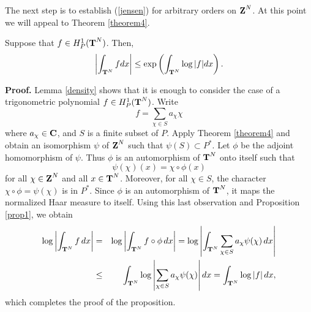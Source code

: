 The next step is to establish (\ref{jensen})
for arbitrary orders on $\Z^N$.  At this point we will
appeal to Theorem \ref{theorem4}.
\begin{prop2}
Suppose that $f\in H^1_{P}(\T^N)$.  Then, 
$$\left|\int_{\T^N}fdx\right|\leq \exp\left(\int_{\T^N}\log|f|dx\right).$$
\label{prop2}
\end{prop2}
{\bf Proof.}  
Lemma \ref{density} shows that it is enough
to consider the case of a trigonometric polynomial 
$f\in H^1_P(\T^N)$.  Write 
$$f=\sum_{\chi\in S}a_\chi \chi$$
where $a_\chi\in \C$, and $S$ is a finite subset of $P$.
Apply Theorem \ref{theorem4} and obtain an isomorphism $\psi$ 
of $\Z^N$
such that $\psi(S)\subset P^*$.  
Let $\phi$ be the adjoint homomorphism of $\psi$.
Thus $\phi$ is an automorphism
of $\T^N$ onto itself such that
$$\psi(\chi)(x)=\chi\circ\phi(x)$$
for all $\chi\in \Z^N$ and all $x\in \T^N$.  Moreover,
for all $\chi\in S$, the character
$\chi\circ\phi=\psi(\chi)$ is in $P^*$.
Since $\phi$ is an automorphism of $\T^N$, it maps 
the 
normalized Haar measure to itself.
Using this last observation and Proposition \ref{prop1}, we obtain
\begin{eqnarray*}
\log\left|\int_{\T^N}f\, dx\right|
				&=&
\log\left|\int_{\T^N}f\circ\phi\, dx\right|
				=
\log\left|\int_{\T^N}\sum_{\chi\in S}a_\chi \psi(\chi)\, dx\right|\\
				&\leq&
\int_{\T^N}\log\left|\sum_{\chi\in S}a_\chi \psi(\chi)\right| dx
				=
\int_{\T^N}\log\left|f\right| dx,				
\end{eqnarray*}
which completes the 
proof of the proposition.


